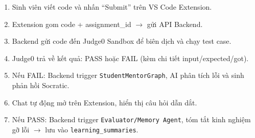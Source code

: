 \begin{enumerate}
    \item Sinh viên viết code và nhấn ``Submit'' trên VS Code Extension.
    \item Extension gom code + assignment\_id $\rightarrow$ gửi API Backend.
    \item Backend gửi code đến Judge0 Sandbox để biên dịch và chạy test case.
    \item Judge0 trả về kết quả: PASS hoặc FAIL (kèm chi tiết input/expected/got).
    \item Nếu FAIL: Backend trigger \texttt{StudentMentorGraph}, AI phân tích lỗi và sinh phản hồi Socratic.
    \item Chat tự động mở trên Extension, hiển thị câu hỏi dẫn dắt.
    \item Nếu PASS: Backend trigger \texttt{Evaluator/Memory Agent}, tóm tắt kinh nghiệm gỡ lỗi $\rightarrow$ lưu vào \texttt{learning\_summaries}.
\end{enumerate}

